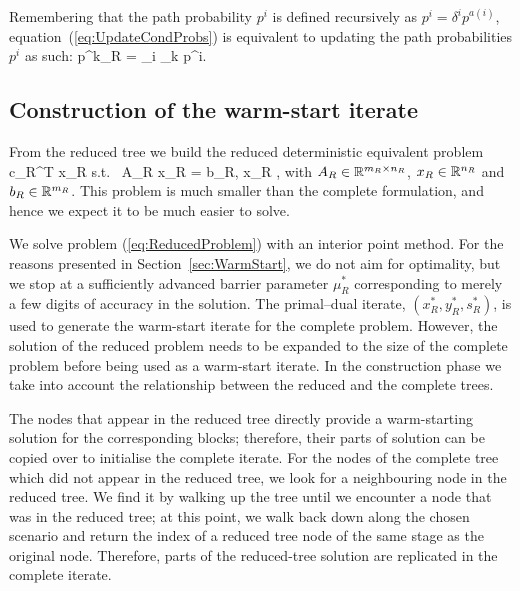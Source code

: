 Remembering that the path probability $p^i$ is defined recursively as
$p^i = \delta^i p^{a(i)}$, equation~(\ref{eq:UpdateCondProbs}) is equivalent 
to updating the path probabilities $p^i$ as such:
\be  \label{eq:UpdatePathProbs}
  p^k_R = \sum_{i \in {}_k} p^i.
\ee

%
%
\subsection{Construction of the warm-start iterate}
\label{sec:Construction}

From the reduced tree we build the reduced deterministic 
equivalent problem
\be \label{eq:ReducedProblem}
\min\; c_R^T x_R \;\quad \mbox{s.t. }\; A_R x_R = b_R, \; x_R ,
\ee
with $A_R \in \mathbb{R}^{m_R\times n_R}$, $x_R \in 
\mathbb{R}^{n_R}$ and $b_R \in \mathbb{R}^{m_R}$. This problem is 
much smaller than the complete formulation, and hence we expect it to 
be much easier to solve.

We solve problem (\ref{eq:ReducedProblem}) with an interior point method. 
For the reasons presented in Section~\ref{sec:WarmStart}, we do not 
aim for optimality, but we stop at a sufficiently advanced barrier 
parameter $\mu^*_R$ corresponding to merely a few digits of accuracy in the 
solution. The primal--dual iterate, $(x_R^*,y_R^*,s_R^*)$, 
is used to generate the warm-start iterate for the complete problem.
However, the solution of the reduced problem needs to be expanded to the size 
of the complete problem before being used as a warm-start iterate.
In the construction phase we take into account the relationship
between the reduced and the complete trees.

The nodes that appear in the reduced tree directly provide a warm-starting
solution for the corresponding blocks; therefore, their parts of solution
can be copied over to initialise the complete iterate.
%
For the nodes of the complete tree which did not appear in the reduced 
tree, we look for a neighbouring node in the reduced tree. We find it 
by walking up the tree until we encounter a node that was in the reduced 
tree; at this point, we walk back down along the chosen scenario and return 
the index of a reduced tree node of the same stage as the original 
node.
Therefore, parts of the reduced-tree solution are replicated in the 
complete iterate. 

